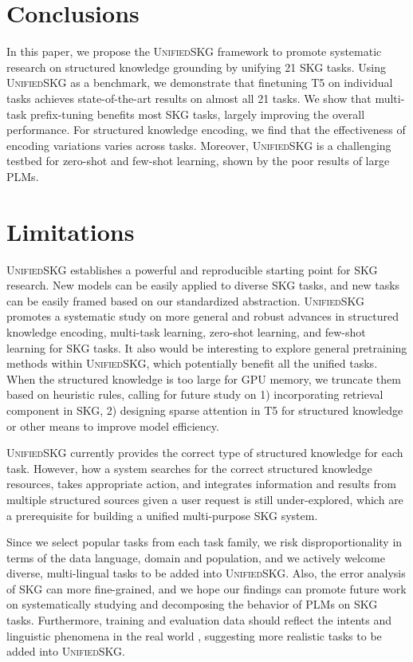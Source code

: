\section{Conclusions}
In this paper, we propose the \textsc{Unified}SKG framework to promote systematic research on structured knowledge grounding by unifying 21 SKG tasks. Using \textsc{Unified}SKG as a benchmark, we demonstrate that finetuning T5 on individual tasks achieves state-of-the-art results on almost all 21 tasks. We show that multi-task prefix-tuning benefits most SKG tasks, largely improving the overall performance. For structured knowledge encoding, we find that the effectiveness of encoding variations varies across tasks. Moreover, \textsc{Unified}SKG is a challenging testbed for zero-shot and few-shot learning, shown by the poor results of large PLMs. 

\section{Limitations}

\textsc{Unified}SKG establishes a powerful and reproducible starting point for SKG research. New models can be easily applied to diverse SKG tasks, and new tasks can be easily framed based on our standardized abstraction.
\textsc{Unified}SKG promotes a systematic study on more general and robust advances in structured knowledge encoding, multi-task learning, zero-shot learning, and few-shot learning for SKG tasks. It also would be interesting to explore general pretraining methods within \textsc{Unified}SKG, which potentially benefit all the unified tasks. When the structured knowledge is too large for GPU memory, we truncate them based on heuristic rules, calling for future study on 1) incorporating retrieval component in SKG, 2) designing sparse attention in T5 for structured knowledge or other means to improve model efficiency. 

\textsc{Unified}SKG currently provides the correct type of structured knowledge for each task. However, how a system searches for the correct structured knowledge resources, takes appropriate action, and integrates information and results from multiple structured sources given a user request is still under-explored, which are a prerequisite for building a unified multi-purpose SKG system. 

Since we select popular tasks from each task family, we risk disproportionality in terms of the data language,  domain and population, and we actively welcome diverse, multi-lingual tasks to be added into \textsc{Unified}SKG. 
Also, the error analysis of SKG can more fine-grained, and we hope our findings can promote future work on systematically studying and decomposing the behavior of PLMs on SKG tasks. Furthermore, training and evaluation data should reflect the intents and linguistic phenomena in the real world \cite{Vries2020TowardsEV}, suggesting more realistic tasks to be added into \textsc{Unified}SKG. 


